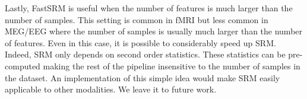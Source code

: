 \documentclass{article}
\newcommand{\bt}[1]{\todo[color=orange, inline=True]{BT: #1}}
\begin{document}
Lastly, FastSRM is useful when the number of features is much larger than the
number of samples. This setting is common in fMRI but less common in MEG/EEG where
the number of samples is usually much larger than the number of features. Even
in this case, it is possible to considerably speed up SRM. Indeed, SRM only
depends on second order statistics.
These statistics can be pre-computed making the rest of the
pipeline insensitive to the number of samples in the dataset. An implementation
of this simple idea would make SRM easily applicable to other modalities.
We leave it to future work.



\end{document}
